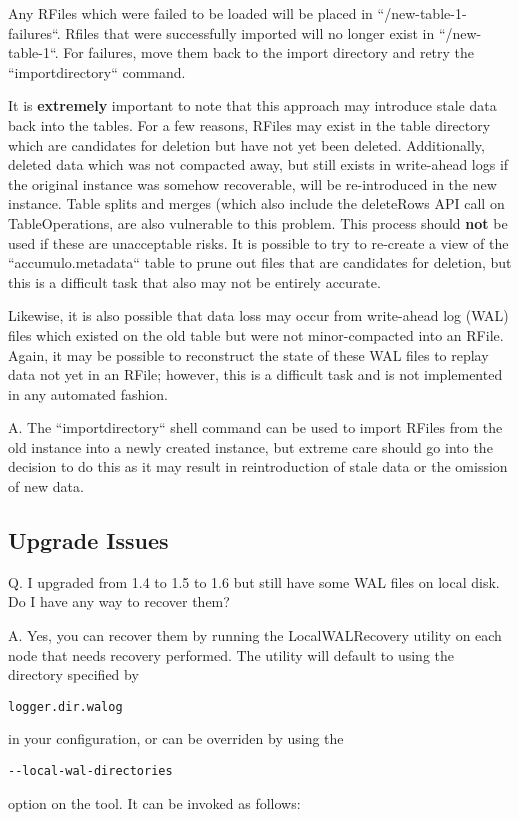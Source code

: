 Any RFiles which were failed to be loaded will be placed in ``/new-table-1-failures``. Rfiles that were successfully
imported will no longer exist in ``/new-table-1``. For failures, move them back to the import directory and retry
the ``importdirectory`` command.

It is \textbf{extremely} important to note that this approach may introduce stale data back into
the tables. For a few reasons, RFiles may exist in the table directory which are candidates for deletion but have
not yet been deleted. Additionally, deleted data which was not compacted away, but still exists in write-ahead logs if
the original instance was somehow recoverable, will be re-introduced in the new instance. Table splits and merges
(which also include the deleteRows API call on TableOperations, are also vulnerable to this problem. This process should
\textbf{not} be used if these are unacceptable risks. It is possible to try to re-create a view of the ``accumulo.metadata``
table to prune out files that are candidates for deletion, but this is a difficult task that also may not be entirely accurate.

Likewise, it is also possible that data loss may occur from write-ahead log (WAL) files which existed on the old table but
were not minor-compacted into an RFile. Again, it may be possible to reconstruct the state of these WAL files to
replay data not yet in an RFile; however, this is a difficult task and is not implemented in any automated fashion.

A. The ``importdirectory`` shell command can be used to import RFiles from the old instance into a newly created instance,
but extreme care should go into the decision to do this as it may result in reintroduction of stale data or the
omission of new data.

\subsection{Upgrade Issues}
Q. I upgraded from 1.4 to 1.5 to 1.6 but still have some WAL files on local disk. Do I have any way to recover them?

A. Yes, you can recover them by running the LocalWALRecovery utility on each node that needs recovery performed. The utility
will default to using the directory specified by \begin{verbatim}logger.dir.walog\end{verbatim} in your configuration, or can be
overriden by using the \begin{verbatim}--local-wal-directories\end{verbatim} option on the tool. It can be invoked as follows:

